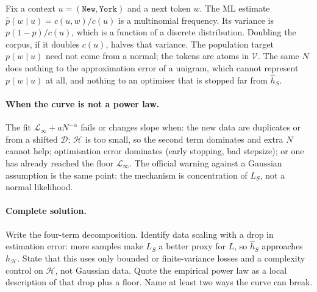 \documentclass[11pt,a4paper]{article}
\theoremstyle{definition}
\begin{document}
\begin{example}
Fix a context \(u=(\texttt{New},\texttt{York})\) and a next token \(w\). The ML estimate \(\widehat p(w\mid u)=c(u,w)/c(u)\) is a multinomial frequency. Its variance is \(p(1-p)/c(u)\), which is a function of a discrete distribution. Doubling the corpus, if it doubles \(c(u)\), halves that variance. The population target \(p(w\mid u)\) need not come from a normal; the tokens are atoms in \(\mathcal{V}\). The same \(N\) does nothing to the approximation error of a unigram, which cannot represent \(p(w\mid u)\) at all, and nothing to an optimiser that is stopped far from \(\widehat h_S\).
\end{example}

\paragraph{When the curve is not a power law.}
The fit \(\mathcal{L}_\infty+aN^{-\alpha}\) fails or changes slope when: the new data are duplicates or from a shifted \(\mathcal{D}\); \(\mathcal{H}\) is too small, so the second term dominates and extra \(N\) cannot help; optimisation error dominates (early stopping, bad stepsize); or one has already reached the floor \(\mathcal{L}_\infty\). The official warning against a Gaussian assumption is the same point: the mechanism is concentration of \(L_S\), not a normal likelihood.

\paragraph{Complete solution.}
Write the four-term decomposition. Identify data scaling with a drop in estimation error: more samples make \(L_S\) a better proxy for \(L\), so \(\widehat h_S\) approaches \(h_{\mathcal{H}}\). State that this uses only bounded or finite-variance losses and a complexity control on \(\mathcal{H}\), not Gaussian data. Quote the empirical power law as a local description of that drop plus a floor. Name at least two ways the curve can break.
\end{document}
